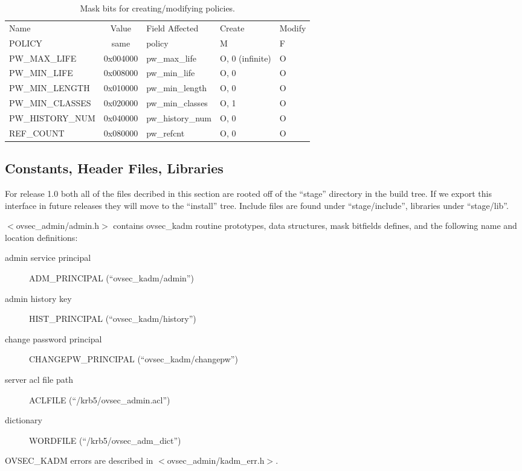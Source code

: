 \begin{table}[htbp]
\begin{tabular}{@{}lclll}
Name & Value & Field Affected & Create & Modify \\
POLICY                  & same     & policy & M & F \\
PW_MAX_LIFE             & 0x004000 & pw_max_life & O, 0 (infinite) & O \\
PW_MIN_LIFE             & 0x008000 & pw_min_life & O, 0 & O \\
PW_MIN_LENGTH           & 0x010000 & pw_min_length & O, 0 & O \\
PW_MIN_CLASSES          & 0x020000 & pw_min_classes & O, 1 & O \\
PW_HISTORY_NUM          & 0x040000 & pw_history_num & O, 0 & O \\
REF_COUNT               & 0x080000 & pw_refcnt & O, 0 & O 
\end{tabular}
\caption{Mask bits for creating/modifying policies.}
\label{tab:policy-bits}
\end{table}

\subsection{Constants, Header Files, Libraries}

For release 1.0 both all of the files decribed in this section are
rooted off of the ``stage'' directory in the build tree.  If we export
this interface in future releases they will move to the ``install''
tree. Include files are found under ``stage/include'', libraries under
``stage/lib''.

$<$ovsec_admin/admin.h$>$ contains ovsec_kadm routine prototypes, data
structures, mask bitfields defines, and the following name and
location definitions:

\begin{description}
\item[admin service principal] ADM_PRINCIPAL (``ovsec_kadm/admin'')
\item[admin history key] HIST_PRINCIPAL (``ovsec_kadm/history'')
\item[change password principal] CHANGEPW_PRINCIPAL (``ovsec_kadm/changepw'')
\item[server acl file path] ACLFILE (``/krb5/ovsec_admin.acl'')
\item[dictionary] WORDFILE (``/krb5/ovsec_adm_dict'')
\end{description}

OVSEC_KADM errors are described in $<$ovsec_admin/kadm_err.h$>$.


